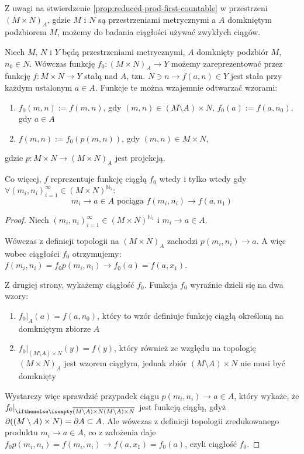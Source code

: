 Z uwagi na stwierdzenie \ref{prop:reduced-prod-first-countable} w przestrzeni $(M\times N)_A$, gdzie $M$ i $N$ są przestrzeniami metrycznymi a $A$ domkniętym podzbiorem $M$, możemy do badania ciągłości używać zwykłych ciągów.

\begin{lem} \label{lem:reduced-product-continuous}
  Niech $M$, $N$ i $Y$ będą przestrzeniami metrycznymi, $A$ domknięty podzbiór $M$, $n_0 \in N$. Wówczas funkcję $f_0: (M \times N)_A \rightarrow Y$ możemy zareprezentować przez funkcję $f: M \times N \rightarrow Y$ stałą nad $A$, tzn. $N \ni n \rightarrow f(a, n) \in Y$ jest stała przy każdym ustalonym $a \in A$. Funkcje te można wzajemnie odtwarzać wzorami:
  \begin{enumerate}
   \item $f_0(m,n) := f(m,n)$, gdy $(m,n) \in (M \setminus A) \times N$, $f_0(a) := f(a, n_0)$, gdy $a \in A$
   \item $f(m,n) := f_0(p(m,n))$, gdy $(m,n) \in M \times N$,
  \end{enumerate}
  gdzie $p: M\times N \to (M\times N)_A$ jest projekcją.

  
  Co więcej, $f$ reprezentuje funkcję ciągłą $f_0$ wtedy i tylko wtedy gdy $\forall (m_i, n_i)_{i=1}^\infty \in (M \times N)^{\mathbb{N}_1}:$
  \[m_i \rightarrow a \in A \mbox{ pociąga } f(m_i, n_i) \rightarrow f(a, n_1)\]
  
  \begin{proof}
    Niech $(m_i, n_i)_{i=1}^\infty \in (M \times N)^{\mathbb{N}_1}$ i $m_i \rightarrow a \in A$.
    
    Wówczas z definicji topologii na $(M \times N)_A$ zachodzi $p(m_i, n_i) \rightarrow a$. A więc wobec ciągłości $f_0$ otrzymujemy: $f(m_i, n_i) = f_0 p(m_i, n_i) \rightarrow f_0(a) = f(a, x_1)$.
    
    Z drugiej strony, wykażemy ciągłość $f_0$. Funkcja $f_0$ wyraźnie dzieli się na dwa wzory:
    \begin{enumerate}
     \item $f_0|_A(a) = f(a, n_0)$, który to wzór definiuje funkcję ciągłą określoną na domkniętym zbiorze $A$
     \item $f_0|_{(M \setminus A) \times N}(y) = f(y)$, który również ze względu na topologię $(M \times N)_A$ jest wzorem ciągłym, jednak zbiór $(M \setminus A) \times N$ nie musi być domknięty
    \end{enumerate}
    Wystarczy więc sprawdzić przypadek ciągu $p(m_i, n_i) \rightarrow a \in A$, który wykaże, że $f_0|_{\cl{(M \setminus A) \times N}}$ jest funkcją ciągłą, gdyż $\partial((M \setminus A) \times N) = \partial A \subset A$. Ale wówczas z definicji topologii zredukowanego produktu $m_i \rightarrow a \in A$, co z założenia daje $f_0 p(m_i, n_i) = f(m_i, n_i) \rightarrow f(a, x_1) = f_0(a)$, czyli ciągłość $f_0$.
  \end{proof}
\end{lem}

